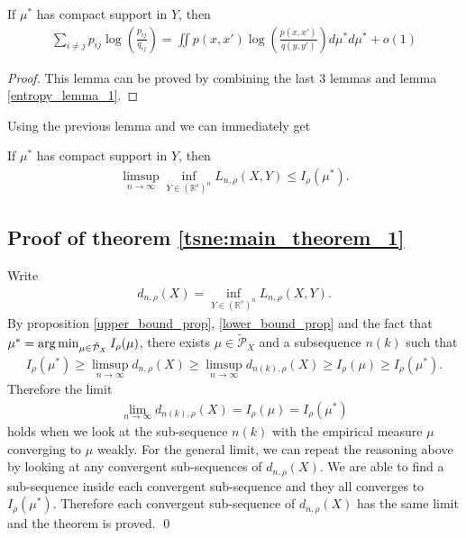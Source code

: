 \begin{lemma}
    If $\mu^*$ has compact support in $Y$, then
    \begin{align}
        \sum_{i \neq j} p_{ij} \log \left(\frac{p_{ij}}{q_{ij}}\right) = \iint p(x,x') \log\left(\frac{p(x,x')}{q(y,y')}\right) d\mu^* d\mu^* +o(1)
    \end{align}
\end{lemma}
\begin{proof}
    This lemma can be proved by combining the last 3 lemmas and lemma \ref{entropy_lemma_1}.
\end{proof}
Using the previous lemma and we can immediately get
\begin{proposition} \label{upper_bound_prop}
    If $\mu^*$ has compact support in $Y$, then
    \begin{align}
        \limsup_{n \to \infty} \inf_{Y \in (\mathbb{R}^s)^n} L_{n,\rho}(X,Y) \leq I_{\rho}(\mu^*).
    \end{align}
\end{proposition}
\subsection{Proof of theorem \ref{tsne:main_theorem_1}}
Write
\begin{align}
    d_{n,\rho}(X) = \inf_{Y \in (\mathbb{R}^s)^n}L_{n,\rho}(X,Y).
\end{align}
By proposition \ref{upper_bound_prop}, \ref{lower_bound_prop} and the fact that $\mu^* = \operatorname*{arg\,min}_{\mu \in \tilde{\mathcal{P}}_X} I_{\rho}(\mu)$, there exists $\mu \in \tilde{\mathcal{P}}_X$ and a subsequence $n(k)$ such that
\begin{align}
    I_{\rho}(\mu^*) \geq \limsup_{n \to \infty} d_{n,\rho}(X) \geq \limsup_{n \to \infty} d_{n(k),\rho}(X) \geq I_{\rho}(\mu) \geq I_{\rho}(\mu^*).
\end{align}
Therefore the limit
\begin{align}
    \lim_{n \to \infty} d_{n(k),\rho}(X) = I_{\rho}(\mu) = I_{\rho}(\mu^*)
\end{align}
holds when we look at the sub-sequence $n(k)$ with the empirical measure $\mu$ converging to $\mu$ weakly. For the general limit, we can repeat the reasoning above by looking at any convergent sub-sequences of $d_{n,\rho}(X)$. We are able to find a sub-sequence inside each convergent sub-sequence and they all converges to $I_{\rho}(\mu^*)$. Therefore each convergent sub-sequence of $d_{n,\rho}(X)$ has the same limit and the theorem is proved. \qed
